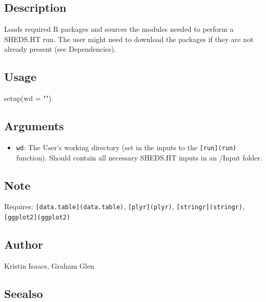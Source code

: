 \documentclass[
]{article}
\newenvironment{Shaded}{\begin{snugshade}}{\end{snugshade}}
\newcommand{\AttributeTok}[1]{\textcolor[rgb]{0.77,0.63,0.00}{#1}}
\newcommand{\FunctionTok}[1]{\textcolor[rgb]{0.00,0.00,0.00}{#1}}
\newcommand{\NormalTok}[1]{#1}
\newcommand{\StringTok}[1]{\textcolor[rgb]{0.31,0.60,0.02}{#1}}
\providecommand{\tightlist}{%
  \setlength{\itemsep}{0pt}\setlength{\parskip}{0pt}}
\begin{document}
\hypertarget{description-51}{%
\subsection{Description}\label{description-51}}

Loads required R packages and sources the modules needed to perform a
SHEDS.HT run. The user might need to download the packages if they are
not already present (see Dependencies).

\hypertarget{usage-51}{%
\subsection{Usage}\label{usage-51}}

\begin{Shaded}
\begin{Highlighting}[]
\FunctionTok{setup}\NormalTok{(}\AttributeTok{wd =} \StringTok{""}\NormalTok{)}
\end{Highlighting}
\end{Shaded}

\hypertarget{arguments-36}{%
\subsection{Arguments}\label{arguments-36}}

\begin{itemize}
\tightlist
\item
  \texttt{wd}: The User's working directory (set in the inputs to the
  \texttt{{[}run{]}(run)} function). Should contain all necessary
  SHEDS.HT inputs in an /Input folder.
\end{itemize}

\hypertarget{note-3}{%
\subsection{Note}\label{note-3}}

Requires: \texttt{{[}data.table{]}(data.table)},
\texttt{{[}plyr{]}(plyr)}, \texttt{{[}stringr{]}(stringr)},
\texttt{{[}ggplot2{]}(ggplot2)}

\hypertarget{author-31}{%
\subsection{Author}\label{author-31}}

Kristin Isaacs, Graham Glen

\hypertarget{seealso-24}{%
\subsection{Seealso}\label{seealso-24}}
\end{document}
